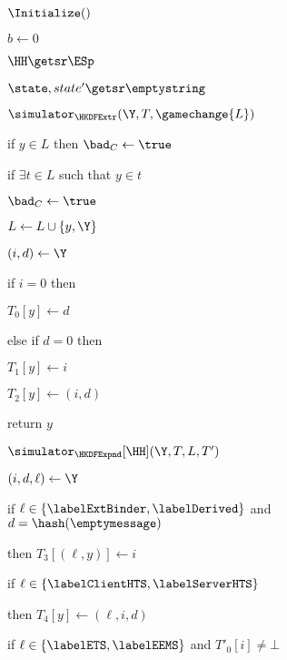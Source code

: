 \begin{figure}[tp]
	\begin{minipage}[t]{0.48\textwidth}
		\NewExperiment[Game $\Gm_7$]
		
		\begin{algorithm}{$\Initialize()$}
			\item $b \gets 0$
			\item $\HH \getsr \ESp$
			\item $\state, state' \getsr \emptystring$
		\end{algorithm}
		\ExptSepSpace
		\begin{oracle}{$\simulator_{\HKDFExtr}(\Y, T, \gamechange{L})$}
			\item {}
			\item if $y \in L$ then $\bad_C \gets \true$
			\item if $\exists t \in L$ such that $y \in t$
			\item \quad $\bad_C \gets \true$
			\item $ L \gets L \cup \{y, \Y\}$
			\item $(i, d) \gets \Y$
			\item if $i = 0$ then 
			\item \quad $T_{0}[y] \gets d$
			\item else if $d = 0$ then 
			\item \quad $T_{1}[y] \gets i$
			\item $T_{2}[y] \gets (i,d)$
			\item return $y$
		\end{oracle}
	\end{minipage}
	\begin{minipage}[t]{0.49\textwidth}
		\ExptSepSpace
		\begin{oracle}{$\simulator_{\HKDFExpnd}[\HH](\Y, T, L, T')$}
			\item {}
			\item $(i, d, \ell) \gets \Y$
			\item if $\ell \in \{\labelExtBinder, \labelDerived\}$ and $d = \hash(\emptymessage)$
			\item \quad then $T_{3}[(\ell,y)] \gets i$
			\item if $\ell \in \{\labelClientHTS, \labelServerHTS\}$
			\item \quad then $T_{4}[y] \gets (\ell, i, d)$
			\item	
			\item if $\ell \in \{\labelETS, \labelEEMS\}$ and $T'_{0}[i] \neq \bot$

\end{oracle}
\end{minipage}
\end{figure}

